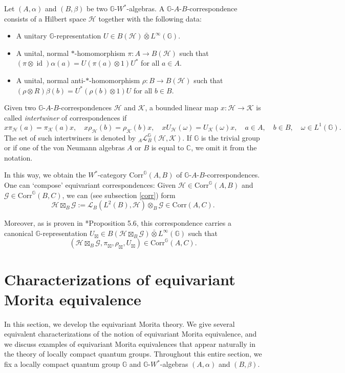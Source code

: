 \documentclass[reqno]{amsart}
\numberwithin{equation}{section}
\DeclareMathOperator{\id}{\mathrm{id}}
\newcommand{\C}{\mathbb{C}}
\newcommand{\G}{\mathbb{G}}
\newcommand{\Corr}{\mathrm{Corr}}
\newcommand{\ovot}{\bar{\otimes}}
\begin{document}
Let $(A, \alpha)$ and $(B, \beta)$ be two $\G$-$W^*$-algebras. 
A $\G$-$A$-$B$-correspondence consists of a Hilbert space $\mathcal{H}$ together with the following data:
\begin{itemize}\setlength\itemsep{-0.5em}
    \item A unitary $\G$-representation $U\in B(\mathcal{H})\ovot L^\infty(\G)$.
    \item A unital, normal $*$-homomorphism $\pi: A\to B(\mathcal{H})$ such that $(\pi\otimes \id)\alpha(a) = U(\pi(a)\otimes 1)U^*$ for all $a\in A$.
    \item A unital, normal anti-$*$-homomorphism $\rho: B \to B(\mathcal{H})$ such that $(\rho\otimes R)\beta(b) = U^*(\rho(b)\otimes 1)U$ for all $b\in B$.
\end{itemize}

Given two $\G$-$A$-$B$-correspondences $\mathcal{H}$ and $\mathcal{K}$, a bounded linear map $x: \mathcal{H}\to \mathcal{K}$ is called \emph{intertwiner} of correspondences if 
$$x\pi_{\mathcal{H}}(a) = \pi_{\mathcal{K}}(a)x, \quad x\rho_{\mathcal{H}}(b) = \rho_{\mathcal{K}}(b)x, \quad x U_{\mathcal{H}}(\omega) = U_{\mathcal{K}}(\omega)x, \quad a\in A, \quad b\in B, \quad \omega \in L^1(\G).$$
The set of such intertwiners is denoted by ${}_A\mathscr{L}_B^\G(\mathcal{H}, \mathcal{K})$. If $\G$ is the trivial group or if one of the von Neumann algebras $A$ or $B$ is equal to $\C$, we omit it from the notation. 

In this way, we obtain the $W^*$-category $\Corr^\G(A,B)$ of $\G$-$A$-$B$-correspondences. One can `compose' equivariant correspondences:
Given $\mathcal{H}\in \Corr^\G(A,B)$ and $\mathcal{G}\in \Corr^\G(B,C)$, we can (see subsection \ref{corr}) form
$$\mathcal{H}\boxtimes_B\mathcal{G}:= \mathscr{L}_B(L^2(B),\mathcal{H})\otimes_B\mathcal{G}\in \Corr(A,C).$$

Moreover, as is proven in \cite{DCDR24a}*{Proposition 5.6}, this correspondence carries a canonical $\G$-representation $U_{\boxtimes}\in B(\mathcal{H}\boxtimes_B \mathcal{G})\ovot L^\infty(\G)$ such that $$(\mathcal{H}\boxtimes_B \mathcal{G}, \pi_\boxtimes, \rho_\boxtimes, U_\boxtimes)\in \Corr^\G(A,C).$$

\section{Characterizations of equivariant Morita equivalence}

In this section, we develop the equivariant Morita theory. We give several equivalent characterizations of the notion of equivariant Morita equivalence, and we discuss examples of equivariant Morita equivalences that appear naturally in the theory of locally compact quantum groups. Throughout this entire section, we fix a locally compact quantum group $\G$ and $\G$-$W^*$-algebras $(A,\alpha)$ and $(B, \beta)$. 
\end{document}
